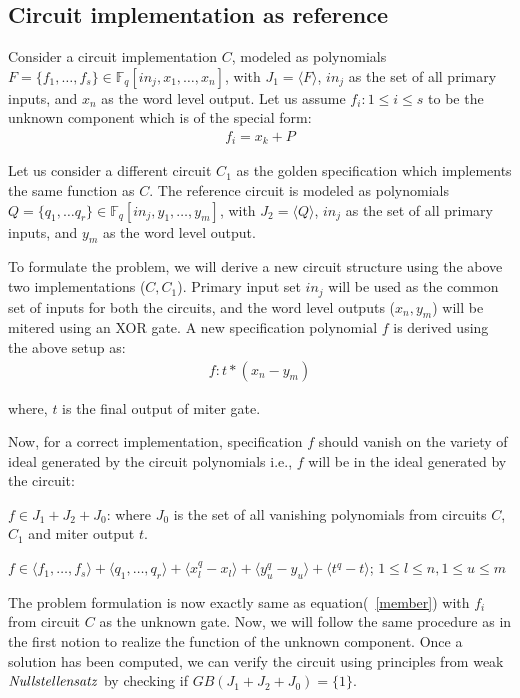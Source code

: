 \subsection{Circuit implementation as reference}
Consider a circuit implementation $C$, modeled as polynomials $F = \{f_1,\dots,f_s\}\in \mathbb{F}_q[in_j,x_1,\dots, x_n]$, with $J_1=\langle F \rangle$, $in_j$ as the set of all primary inputs, and $x_n$ as the word level output. Let us assume $f_i:1\le i \le s$ to be the unknown component which is of the special form:
\begin{gather*} 
f_i = x_k + P
\end{gather*}

Let us consider a different circuit $C_1$ as the golden specification which implements the same function as $C$. The reference circuit is modeled as polynomials $Q = \{q_1,\dots q_r\}\in \mathbb{F}_q[in_j,y_1,\dots, y_m]$, with $J_2=\langle Q \rangle$, $in_j$ as the set of all primary inputs, and $y_m$ as the word level output.

To formulate the problem, we will derive a new circuit structure using the above two implementations ($C,C_1$). Primary input set $in_j$ will be used as the common set of inputs for both the circuits, and the word level outputs ($x_n,y_m$) will be mitered using an XOR gate. A new specification polynomial $f$ is derived using the above setup as:
\begin{gather}
f : t*(x_n-y_m)
\end{gather}

where, $t$ is the final output of miter gate.

Now, for a correct implementation, specification $f$ should vanish on the variety of ideal generated by the circuit polynomials i.e., $f$ will be in the ideal generated by the circuit:

$f \in J_1 + J_2 + J_0$: where $J_0$ is the set of all vanishing polynomials from circuits $C$, $C_1$ and miter output $t$.

{\small $f \in \langle f_1,\dots,f_s\rangle + \langle q_1,\dots,q_r\rangle + \langle x_l^q-x_l\rangle + \langle y_u^q-y_u\rangle + \langle t^q-t\rangle$; $1\le l \le n,1\le u \le m$}

The problem formulation is now exactly same as equation(~\ref{member}) with $f_i$ from circuit $C$ as the unknown gate. Now, we will follow the same procedure as in the first notion to realize the function of the unknown component. Once a solution has been computed, we can verify the circuit using principles from weak $\it{Nullstellensatz}$ by checking if $GB(J_1+J_2+J_0)=\{1\}$.

